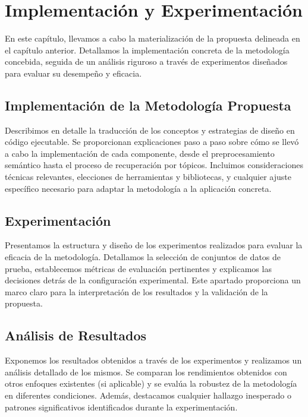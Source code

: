 \chapter{Implementación y Experimentaci\'on}\label{chapter:implementation}

En este capítulo, llevamos a cabo la materialización de la propuesta delineada en el capítulo anterior. Detallamos la implementación concreta de la metodología concebida, seguida de un análisis riguroso a través de experimentos diseñados para evaluar su desempeño y eficacia.

\section{Implementación de la Metodología Propuesta}
Describimos en detalle la traducción de los conceptos y estrategias de diseño en código ejecutable. Se proporcionan explicaciones paso a paso sobre cómo se llevó a cabo la implementación de cada componente, desde el preprocesamiento semántico hasta el proceso de recuperación por tópicos. Incluimos consideraciones técnicas relevantes, elecciones de herramientas y bibliotecas, y cualquier ajuste específico necesario para adaptar la metodología a la aplicación concreta.

\section{Experimentaci\'on}
Presentamos la estructura y diseño de los experimentos realizados para evaluar la eficacia de la metodología. Detallamos la selección de conjuntos de datos de prueba, establecemos métricas de evaluación pertinentes y explicamos las decisiones detrás de la configuración experimental. Este apartado proporciona un marco claro para la interpretación de los resultados y la validación de la propuesta.

\section{An\'alisis de Resultados}
Exponemos los resultados obtenidos a través de los experimentos y realizamos un análisis detallado de los mismos. Se comparan los rendimientos obtenidos con otros enfoques existentes (si aplicable) y se evalúa la robustez de la metodología en diferentes condiciones. Además, destacamos cualquier hallazgo inesperado o patrones significativos identificados durante la experimentación.
